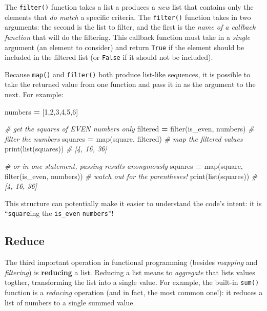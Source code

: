 \documentclass[]{book}
\newenvironment{Shaded}{\begin{snugshade}}{\end{snugshade}}
\newcommand{\DecValTok}[1]{\textcolor[rgb]{0.00,0.00,0.81}{#1}}
\newcommand{\CommentTok}[1]{\textcolor[rgb]{0.56,0.35,0.01}{\textit{#1}}}
\newcommand{\OperatorTok}[1]{\textcolor[rgb]{0.81,0.36,0.00}{\textbf{#1}}}
\newcommand{\BuiltInTok}[1]{#1}
\newcommand{\NormalTok}[1]{#1}
\begin{document}
The \texttt{filter()} function takes a list a produces a \emph{new} list
that contains only the elements that \emph{do match} a specific
criteria. The \texttt{filter()} function takes in two arguments: the
second is the list to filter, and the first is the \emph{name of a
callback function} that will do the filtering. This callback function
must take in a \emph{single} argument (an element to consider) and
return \texttt{True} if the element should be included in the filtered
list (or \texttt{False} if it should not be included).

Because \texttt{map()} and \texttt{filter()} both produce list-like
sequences, it is possible to take the returned value from one function
and pass it in as the argument to the next. For example:

\begin{Shaded}
\begin{Highlighting}[]
\NormalTok{numbers }\OperatorTok{=}\NormalTok{ [}\DecValTok{1}\NormalTok{,}\DecValTok{2}\NormalTok{,}\DecValTok{3}\NormalTok{,}\DecValTok{4}\NormalTok{,}\DecValTok{5}\NormalTok{,}\DecValTok{6}\NormalTok{]}

\CommentTok{# get the squares of EVEN numbers only}
\NormalTok{filtered }\OperatorTok{=} \BuiltInTok{filter}\NormalTok{(is_even, numbers)  }\CommentTok{# filter the numbers}
\NormalTok{squares }\OperatorTok{=} \BuiltInTok{map}\NormalTok{(square, filtered)  }\CommentTok{# map the filtered values}
\BuiltInTok{print}\NormalTok{(}\BuiltInTok{list}\NormalTok{(squares))  }\CommentTok{# [4, 16, 36]}

\CommentTok{# or in one statement, passing results anonymously}
\NormalTok{squares }\OperatorTok{=} \BuiltInTok{map}\NormalTok{(square,}
          \BuiltInTok{filter}\NormalTok{(is_even,}
\NormalTok{          numbers))  }\CommentTok{# watch out for the parentheses!}
\BuiltInTok{print}\NormalTok{(}\BuiltInTok{list}\NormalTok{(squares))  }\CommentTok{# [4, 16, 36]}
\end{Highlighting}
\end{Shaded}

This structure can potentially make it easier to understand the code's
intent: it is ``\texttt{square}ing the \texttt{is\_even}
\texttt{numbers}''!

\hypertarget{reduce}{\subsection{Reduce}\label{reduce}}

The third important operation in functional programming (besides
\emph{mapping} and \emph{filtering}) is \textbf{reducing} a list.
Reducing a list means to \emph{aggregate} that lists values togther,
transforming the list into a single value. For example, the built-in
\texttt{sum()} function is a \emph{reducing} operation (and in fact, the
most common one!): it reduces a list of numbers to a single summed
value.
\end{document}
